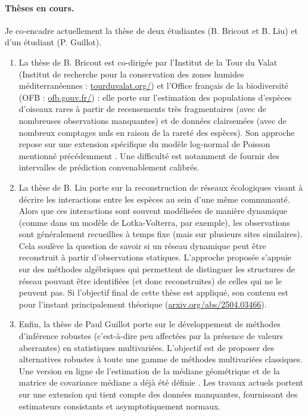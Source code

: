 \paragraph{Thèses en cours.}
Je co-encadre actuellement la thèse de deux étudiantes (B. Bricout et B. Liu) et d'un étudiant (P. Guillot). 
\begin{enumerate}[$\bullet$]
  \item La thèse de B. Bricout est co-dirigée par l'Institut de la Tour du Valat (Institut de recherche pour la conservation des zones humides méditerranéennes : \url{tourduvalat.org/}) et l'Office français de la biodiversité (OFB : \url{ofb.gouv.fr/}) : elle porte sur l'estimation des populations d'espèces d'oiseaux rares à partir de recensements très fragmentaires (avec de nombreuses observations manquantes) et de données clairsemées (avec de nombreux comptages nuls en raison de la rareté des espèces). Son approche repose sur une extension spécifique du modèle log-normal de Poisson mentionné précédemment \cite{BDD26}. Une difficulté est notamment de fournir des intervalles de prédiction convenablement calibrés.
  \item La thèse de B. Liu porte sur la reconstruction de réseaux écologiques visant à décrire les interactions entre les espèces au sein d’une même communauté. Alors que ces interactions sont souvent modélisées de manière dynamique (comme dans un modèle de Lotka-Volterra, par exemple), les observations sont généralement recueillies à temps fixe (mais sur plusieurs sites similaires). Cela soulève la question de savoir si un réseau dynamique peut être reconstruit à partir d’observations statiques. 
  L'approche proposée s'appuie sur des méthodes algébriques qui permettent de distinguer les structures de réseau pouvant être identifiées (et donc reconstruites) de celles qui ne le peuvent pas. 
  Si l'objectif final de cette thèse est appliqué, son contenu est pour l'instant principalement théorique (\url{arxiv.org/abs/2504.03466}). 
  \item Enfin, la thèse de Paul Guillot porte sur le développement de méthodes d'inférence robustes (c'est-à-dire peu affectées par la présence de valeurs aberrantes) en statistiques multivariées. L'objectif est de proposer des alternatives robustes à toute une gamme de méthodes multivariées classiques. Une version en ligne de l'estimation de la médiane géométrique et de la matrice de covariance médiane a déjà été définie \cite{GGR26}. Les travaux actuels portent sur une extension qui tient compte des données manquantes, fournissant des estimateurs consistants et asymptotiquement normaux.
\end{enumerate}


